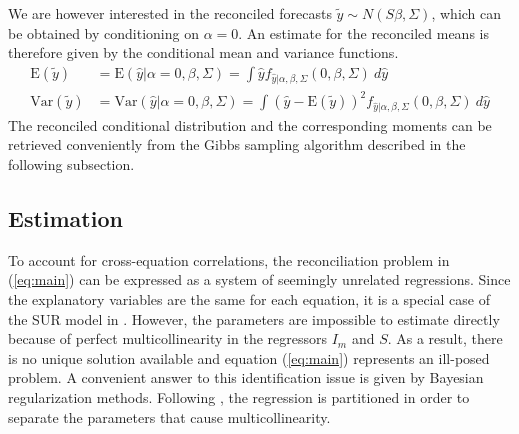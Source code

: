 \documentclass[a4paper,fleqn,11pt]{article}
\begin{document}
We are however interested in the reconciled forecasts $\tilde{y} \sim N(S\beta,\Sigma)$, which can be obtained by conditioning on $\alpha = 0$. An estimate for the reconciled means is therefore given by the conditional mean and variance functions.
\begin{align*}
\text{E}(\tilde{y}) &= \text{E}(\hat{y}|\alpha = 0,\beta,\Sigma) = \int \hat{y} f_{\hat{y}|\alpha,\beta,\Sigma}(0,\beta,\Sigma)\ d\hat{y} \\
\text{Var}(\tilde{y}) &= \text{Var}(\hat{y}|\alpha = 0,\beta,\Sigma) =  \int (\hat{y} - \text{E}(\tilde{y}))^2 f_{\hat{y}|\alpha,\beta,\Sigma}(0,\beta,\Sigma)\ d\hat{y}
\end{align*}
The reconciled conditional distribution and the corresponding moments can be retrieved conveniently from the Gibbs sampling algorithm described in the following subsection.\\

\subsection{Estimation}
To account for cross-equation correlations, the reconciliation problem in (\ref{eq:main}) can be expressed as a system of seemingly unrelated regressions. Since the explanatory variables are the same for each equation, it is a special case of the SUR model in \cite{Zellner1962}. However, the parameters are impossible to estimate directly because of perfect multicollinearity in the regressors $I_m$ and $S$. As a result, there is no unique solution available and equation (\ref{eq:main}) represents an ill-posed problem. A convenient answer to this identification issue is given by Bayesian regularization methods. Following \cite{Farebrother1978}, the regression is partitioned in order to separate the parameters that cause multicollinearity.\\
\end{document}
